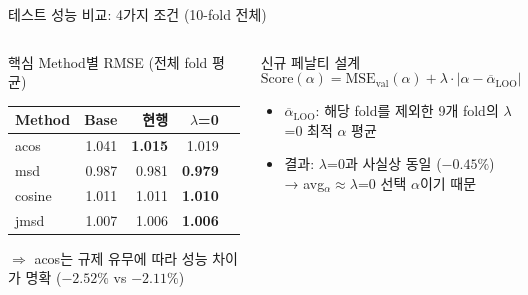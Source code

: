 \documentclass[aspectratio=169,10pt]{beamer}
\begin{document}
\begin{frame}[shrink=5]{테스트 성능 비교: 4가지 조건 (10-fold 전체)}
\begin{columns}[T]
			\begin{alertblock}{핵심 Method별 RMSE (전체 fold 평균)}
				\small
				\begin{tabular}{lrrrr}
					\toprule
					Method & Base & 현행 & $\lambda$=0 \\
					\midrule
					acos  & 1.041 & \textbf{1.015} & 1.019 \\
					msd   & 0.987 & 0.981 & \textbf{0.979} \\
					cosine & 1.011 & 1.011 & \textbf{1.010} \\
					jmsd  & 1.007 & 1.006 & \textbf{1.006} \\
					\bottomrule
				\end{tabular}
				\vspace{0.3em}
				\small $\Rightarrow$ acos는 규제 유무에 따라 성능 차이가 명확 ($-2.52\%$ vs $-2.11\%$)
			\end{alertblock}
			\begin{block}{신규 페날티 설계}
				\[ \text{Score}(\alpha) = \text{MSE}_{\text{val}}(\alpha) + \lambda \cdot |\alpha - \overline\alpha_{\text{LOO}}| \]
				\begin{itemize}
					\item $\overline\alpha_{\text{LOO}}$: 해당 fold를 제외한 9개 fold의 $\lambda$=0 최적 $\alpha$ 평균
					\item 결과: $\lambda$=0과 사실상 동일 ($-0.45\%$) \\ \small → avg$_\alpha \approx \lambda$=0 선택 $\alpha$이기 때문
				\end{itemize}
			\end{block}
	\end{columns}
\end{frame}
\end{document}
